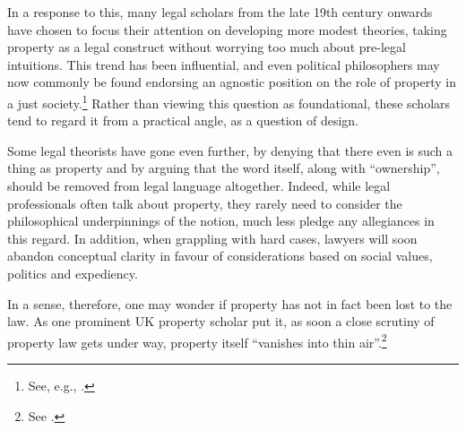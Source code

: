 \documentclass{book} %
\begin{document}
In a response to this, many legal scholars from the late 19th century onwards have chosen to focus their attention on developing more modest theories, taking property as a legal construct without worrying too much about pre-legal intuitions. This trend has been influential, and even political philosophers may now commonly be found endorsing an agnostic position on the role of property in a just society.\footnote{See, e.g., \cite[274]{rawls71}.} Rather than viewing this question as foundational, these scholars tend to regard it from a practical angle, as a question of design.

Some legal theorists have gone even further, by denying that there even is such a thing as property and by arguing that the word itself, along with ``ownership'', should be removed from legal language altogether. Indeed, while legal professionals often talk about property, they rarely need to consider the philosophical underpinnings of the notion, much less pledge any allegiances in this regard. In addition, when grappling with hard cases, lawyers will soon abandon conceptual clarity in favour of considerations based on social values, politics and expediency.

In a sense, therefore, one may wonder if property has not in fact been lost to the law. As one prominent UK property scholar put it, as soon a close scrutiny of property law gets under way, property itself ``vanishes into thin air''.\footnote{See \cite[306-307]{gray91}.}
\end{document}
